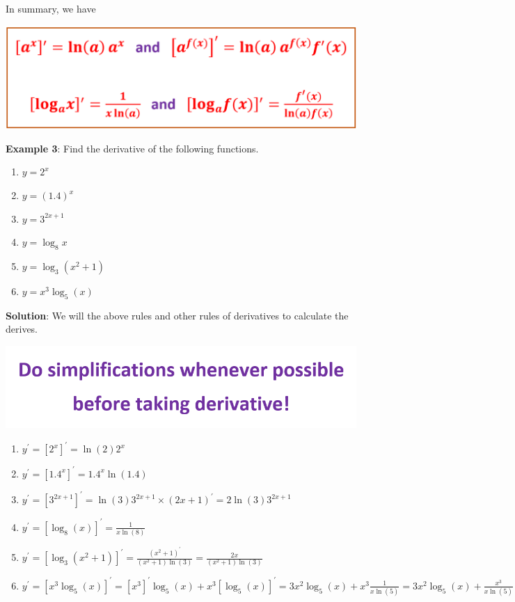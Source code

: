 \documentclass[
]{book}
\begin{document}
In summary, we have

\begin{center}\includegraphics[width=0.8\linewidth]{img06/w06-DerivativeExploga} \end{center}

\textbf{Example 3}: Find the derivative of the following functions.

\begin{enumerate}
\def\labelenumi{(\arabic{enumi})}
\item
  \(y = 2^x\)
\item
  \(y = (1.4)^x\)
\item
  \(y = 3^{2x + 1}\)
\item
  \(y = \log_8 x\)
\item
  \(y = \log_3 (x^2 + 1)\)
\item
  \(y = x^3 \log_5(x)\)
\end{enumerate}

\textbf{Solution}: We will the above rules and other rules of derivatives to calculate the derives.

\begin{center}\includegraphics[width=0.8\linewidth]{img06/w06-Advice} \end{center}

\begin{enumerate}
\def\labelenumi{(\arabic{enumi})}
\item
  \(y^\prime = [2^x]^\prime = \ln(2) 2^x\)
\item
  \(y^\prime = [1.4^x]^\prime = 1.4^x \ln(1.4)\)
\item
  \(y^\prime = [3^{2x+1}]^\prime = \ln(3)3^{2x+1}\times(2x+1)^\prime = 2\ln(3) 3^{2x+1}\)
\item
  \(y^\prime = [\log_8(x)]^\prime = \frac{1}{x \ln(8)}\)
\item
  \(y^\prime = [\log_3(x^2+1)]^\prime = \frac{(x^2+1)^\prime}{(x^2+1)\ln(3)} = \frac{2x}{(x^2+1)\ln(3)}\)
\item
  \(y^\prime = [x^3\log_5(x)]^\prime = [x^3]^\prime \log_5(x) + x^3 [\log_5(x)]^\prime = 3x^2\log_5(x) + x^3\frac{1}{x\ln(5)} = 3x^2\log_5(x) + \frac{x^3}{x\ln(5)}\)
\end{enumerate}
\end{document}

